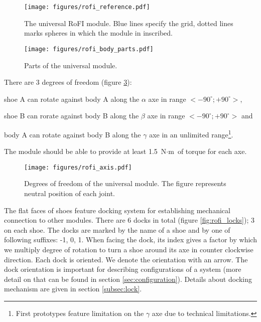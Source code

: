 \begin{figure}
    \centering
    \texttt{[image: figures/rofi\_reference.pdf]}
    \caption{The universal RoFI module. Blue lines specify the grid, dotted
    lines marks spheres in which the module in inscribed. }
    \label{fig:rofi_reference}
\end{figure}

\begin{figure}
    \centering
    \texttt{[image: figures/rofi\_body\_parts.pdf]}
    \caption{Parts of the universal module.}
    \label{fig:rofi_body_parts}
\end{figure}

There are 3 degrees of freedom (figure \ref{fig:rofi_axis}):
\begin{enumerate*}
    \item shoe A can rotate against body A along the $\alpha$ axe in range
    $<-90^\circ; +90^\circ>$,
    \item shoe B can rorate against body B along the $\beta$ axe in range
    $<-90^\circ; +90^\circ>$ and
    \item body A can rotate against body B along the $\gamma$ axe in an
    unlimited range\footnote{First prototypes feature limitation on the $\gamma$
    axe due to technical limitations. }.
\end{enumerate*}
The module should be able to provide at least 1.5 $\text{N}\cdot\text{m}$ of
torque for each axe.

\begin{figure}
    \centering
    \texttt{[image: figures/rofi\_axis.pdf]}
    \caption{Degrees of freedom of the universal module. The figure represents neutral position of each joint.}
    \label{fig:rofi_axis}
\end{figure}

The flat faces of shoes feature docking system for establishing mechanical
connection to other modules. There are 6 docks in total (figure
\ref{fig:rofi_locks}); 3 on each shoe. The docks are marked by the name of a
shoe and by one of following suffixes: -1, 0, 1. When facing the dock, its index
gives a factor by which we multiply degree of rotation to turn a shoe around its
axe in counter clockwise direction. Each dock is oriented. We denote the
orientation with an arrow. The dock orientation is important for describing
configurations of a system (more detail on that can be found in section
\ref{sec:configuration}). Details about docking mechanism are given in section
\ref{subsec:lock}.

